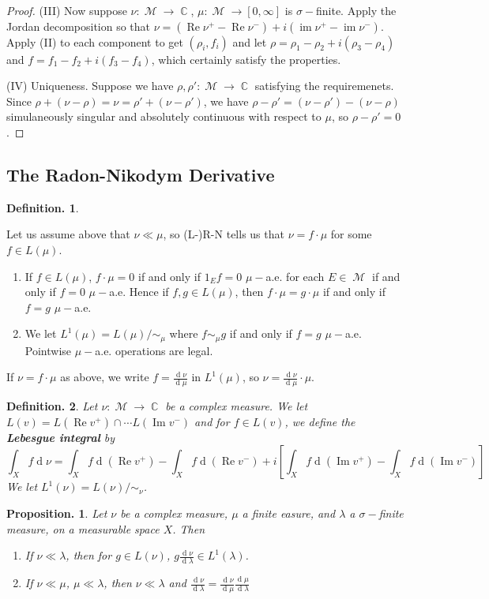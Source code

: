 \documentclass[11pt, a4paper]{memoir}
\DeclareMathOperator{\C}{{\mathbb{C}}}
\theoremstyle{change}
\newtheorem{proposition}[theorem]{Proposition.}
\theoremstyle{plain}
\theoremstyle{nonumberplain}
\newtheorem{definition}{Definition.}
\newtheorem{proof}{Proof}
\DeclareMathOperator{\im}{im}
\DeclareMathOperator{\M}{{\mathcal{M}}}
\renewcommand{\Re}{\ensuremath{\operatorname{Re}}}
\renewcommand{\Im}{\ensuremath{\operatorname{Im}}}
\renewcommand{\d}[1]{\ensuremath{\operatorname{d}\!{#1}}}
\numberwithin{equation}{section}
\begin{document}
\begin{proof}
    (III) Now suppose $\nu:\M\to\C$, $\mu:\M\to[0,\infty]$ is $\sigma-$finite.
    Apply the Jordan decomposition so that $\nu=(\Re\nu^+-\Re\nu^-)+i(\im\nu^+-\im\nu^-)$.
    Apply (II) to each component to get $(\rho_i,f_i)$ and let $\rho=\rho_1-\rho_2+i(\rho_3-\rho_4)$ and $f=f_1-f_2+i(f_3-f_4)$, which certainly satisfy the properties.

    (IV) Uniqueness.
    Suppose we have $\rho,\rho':\M\to\C$ satisfying the requiremenets.
    Since $\rho+(\nu-\rho)=\nu=\rho'+(\nu-\rho')$, we have $\rho-\rho'=(\nu-\rho')-(\nu-\rho)$ simulaneously singular and absolutely continuous with respect to $\mu$, so $\rho-\rho'=0$.
\end{proof}
\subsection{The Radon-Nikodym Derivative}
\begin{definition}
\end{definition}
Let us assume above that $\nu\ll\mu$, so (L-)R-N tells us that $\nu=f\cdot\mu$ for some $f\in L(\mu)$.
\begin{enumerate}
    \item If $f\in L(\mu)$, $f\cdot\mu=0$ if and only if $1_Ef=0$ $\mu-$a.e. for each $E\in\M$ if and only if $f=0$ $\mu-$a.e.
        Hence if $f,g\in L(\mu)$, then $f\cdot\mu=g\cdot\mu$ if and only if $f=g$ $\mu-$a.e.
    \item We let $L^1(\mu)=L(\mu)/\sim_\mu$ where $f\sim_\mu g$ if and only if $f=g$ $\mu-$a.e.
        Pointwise $\mu-$a.e. operations are legal.
\end{enumerate}
If $\nu=f\cdot\mu$ as above, we write $f=\frac{\d{\nu}}{\d{\mu}}$ in $L^1(\mu)$, so $\nu=\frac{\d{\nu}}{\d{\mu}}\cdot\mu$.
\begin{definition}
    Let $\nu:\M\to\C$ be a complex measure.
    We let $L(v)=L(\Re v^+)\cap\cdots L(\Im v^-)$ and for $f\in L(v)$, we define the \textbf{Lebesgue integral} by
    \begin{equation*}
        \int_X f\d{\nu}=\int_X f\d{(\Re v^+)}-\int_X f\d{(\Re v^-)}+i\left[\int_X f\d{(\Im v^+)}-\int_X f\d{(\Im v^-)}\right]
    \end{equation*}
    We let $L^1(\nu)=L(\nu)/\sim_\nu$.
\end{definition}
\begin{proposition}
    Let $\nu$ be a complex measure, $\mu$ a finite easure, and $\lambda$ a $\sigma-$finite measure, on a measurable space $X$.
    Then
    \begin{enumerate}[nolistsep,label=(\roman*)]
        \item If $\nu\ll\lambda$, then for $g\in L(\nu)$, $g\frac{\d{\nu}}{\d{\lambda}}\in L^1(\lambda)$.
        \item If $\nu\ll\mu$, $\mu\ll\lambda$, then $\nu\ll\lambda$ and $\frac{\d{\nu}}{\d{\lambda}}=\frac{\d{\nu}}{\d{\mu}}\frac{\d{\mu}}{\d{\lambda}}$
    \end{enumerate}
\end{proposition}
\end{document}
